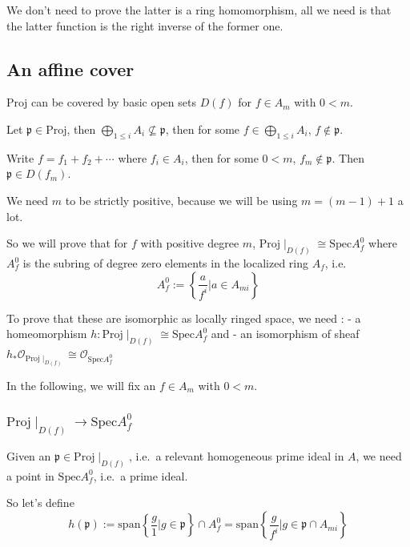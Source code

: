 \documentclass[11pt]{article}
\begin{document}
We don't need to prove the latter is a ring homomorphism, all we need is
that the latter function is the right inverse of the former one.

    \hypertarget{an-affine-cover}{%
\subsection{An affine cover}\label{an-affine-cover}}

    \(\mathrm{Proj}\) can be covered by basic open sets \(D(f)\) for
\(f\in A_m\) with \(0 < m\).

    Let \(\mathfrak p\in\mathrm{Proj}\), then
\(\bigoplus_{1\le i}A_i\not\subseteq\mathfrak p\), then for some
\(f\in\bigoplus_{1\le i}A_i\), \(f\not\in \mathfrak p\).

    Write \(f=f_1+f_2+\cdots\) where \(f_i\in A_i\), then for some \(0<m\),
\(f_m\not\in\mathfrak p\). Then \(\mathfrak p\in D(f_m)\).

    We need \(m\) to be strictly positive, because we will be using
\(m=(m-1)+1\) a lot.

    So we will prove that for \(f\) with positive degree \(m\),
\(\mathrm{Proj}\mid_{D(f)}\cong\mathrm{Spec} A^0_f\) where \(A^0_f\) is
the subring of degree zero elements in the localized ring \(A_f\), i.e.
\[
A^0_f:=\left\{\frac a{f^i} \left| a\in A_{mi}\right.\right\}
\]

To prove that these are isomorphic as locally ringed space, we need : -
a homeomorphism \(h : \mathrm{Proj}\mid_{D(f)}\cong\mathrm{Spec} A^0_f\)
and - an isomorphism of sheaf
\(h_*\mathcal O_{\mathrm{Proj}\mid_{D(f)}}\cong \mathcal O_{\mathrm{Spec}A^0_f}\)

In the following, we will fix an \(f\in A_m\) with \(0 < m\).

    \hypertarget{mathrmprojmid_dftomathrmspec-a0_f}{%
\subsubsection{\texorpdfstring{\(\mathrm{Proj}\mid_{D(f)}\to\mathrm{Spec} A^0_f\)}{\textbackslash mathrm\{Proj\}\textbackslash mid\_\{D(f)\}\textbackslash to\textbackslash mathrm\{Spec\} A\^{}0\_f}}\label{mathrmprojmid_dftomathrmspec-a0_f}}

Given an \(\mathfrak p\in \mathrm{Proj}\mid_{D(f)}\), i.e.~a relevant
homogeneous prime ideal in \(A\), we need a point in
\(\mathrm{Spec}A^0_f\), i.e.~a prime ideal.

So let's define \[
h(\mathfrak p):=\mathrm{span}\left\{\frac g1|g \in \mathfrak p\right\}\cap A^0_f=\mathrm{span}\left\{\frac g{f^i}|g\in \mathfrak p\cap A_{mi}\right\}
\]
\end{document}
